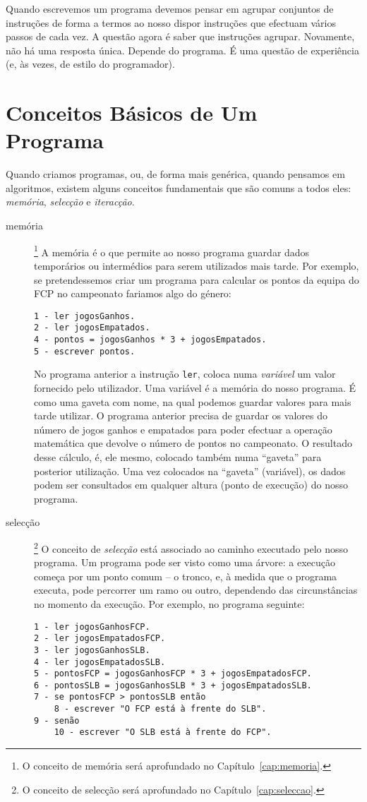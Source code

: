 Quando escrevemos um programa devemos pensar em agrupar conjuntos de instruções de forma a termos ao nosso dispor instruções que efectuam vários passos de cada vez. 
A questão agora é saber que instruções agrupar. Novamente, não há uma resposta única. Depende do programa. É uma questão de experiência (e, às vezes, de estilo do programador).

\section{Conceitos Básicos de Um Programa}
Quando criamos programas, ou, de forma mais genérica, quando pensamos em algoritmos, existem alguns conceitos fundamentais que são comuns a todos eles: \emph{memória}, \emph{selecção} e \emph{iteracção}.

\begin{description}
\item[memória]\footnote{O conceito de memória será aprofundado no Capítulo~\ref{cap:memoria}.}
A memória é o que permite ao nosso programa guardar dados temporários ou intermédios para serem utilizados mais tarde.
Por exemplo, se pretendessemos criar um programa para calcular os pontos da equipa do FCP no campeonato fariamos algo do género:
\begin{verbatim}
1 - ler jogosGanhos.
2 - ler jogosEmpatados.
4 - pontos = jogosGanhos * 3 + jogosEmpatados.
5 - escrever pontos.
\end{verbatim}
No programa anterior a instrução \texttt{ler}, coloca numa \emph{variável} um valor fornecido pelo utilizador. Uma variável
é a memória do nosso programa. É como uma gaveta com nome, na qual podemos guardar valores para mais tarde utilizar.
O programa anterior precisa de guardar os valores do número de jogos ganhos e empatados para poder efectuar a operação matemática que devolve o número de pontos no campeonato. O resultado desse cálculo, é, ele mesmo, colocado também numa ``gaveta'' para posterior utilização. Uma vez colocados na ``gaveta'' (variável), os dados podem ser consultados em qualquer altura (ponto de execução) do nosso programa. 

\item[selecção] \footnote{O conceito de selecção será aprofundado no Capítulo~\ref{cap:seleccao}.}
O conceito de \emph{selecção} está associado ao caminho executado pelo nosso programa. Um programa pode ser visto como uma árvore: a execução começa por um ponto comum -- o tronco, e, à medida que o programa executa, pode percorrer um ramo ou outro, dependendo das circunstâncias no momento da execução.
Por exemplo, no programa seguinte:
\begin{verbatim}
1 - ler jogosGanhosFCP.
2 - ler jogosEmpatadosFCP.
3 - ler jogosGanhosSLB.
4 - ler jogosEmpatadosSLB.
5 - pontosFCP = jogosGanhosFCP * 3 + jogosEmpatadosFCP.
6 - pontosSLB = jogosGanhosSLB * 3 + jogosEmpatadosSLB.
7 - se pontosFCP > pontosSLB então
    8 - escrever "O FCP está à frente do SLB".
9 - senão
    10 - escrever "O SLB está à frente do FCP".     
\end{verbatim}


\end{description}
